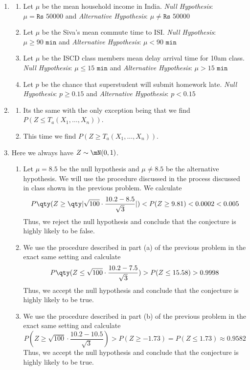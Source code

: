 \documentclass[12pt,english]{article}\usepackage[]{graphicx}\usepackage[]{xcolor}
\begin{document}
\begin{enumerate}[label=\arabic*.]
	\item
	\begin{enumerate}[label=(\alph*)]
		\item Let $\mu$ be the mean household income in India. \textit{Null Hypothesis}: $\mu=\texttt{Rs }50000$ and \textit{Alternative Hypothesis}: $\mu\neq\texttt{Rs }50000$
		\item Let $\mu$ be the Siva's mean commute time to ISI. \textit{Null Hypothesis}: $\mu\geq 90\texttt{ min}$ and \textit{Alternative Hypothesis}: $\mu<90\texttt{ min}$
		\item Let $\mu$ be the ISCD class members mean delay arrival time for 10am class. \textit{Null Hypothesis}: $\mu\leq 15 \texttt{ min}$ and \textit{Alternative Hypothesis}: $\mu>15 \texttt{ min}$
		\item Let $p$ be the chance that superstudent will submit homework late. \textit{Null Hypothesis}: $p\geq 0.15$ and \textit{Alternative Hypothesis}: $p<0.15$
	\end{enumerate}
	\item
	\begin{enumerate}[label=(\alph*)]
		\item Its the same with the only exception being that we find $P(Z\leq T_a(X_1,\ldots,X_n)).$
		\item This time we find $P(Z\geq T_a(X_1,\ldots,X_n)).$
	\end{enumerate}
	\item Here we always have $Z\sim\mN(0,1)$.
	\begin{enumerate}[label=(\alph*)]
		\item Let $\mu=8.5$ be the null hypothesis and $\mu\neq 8.5$ be the alternative hypothesis. We will use the procedure discussed in the process discussed in class shown in the previous problem. We calculate
		\[
			P\qty(Z\geq\qty|\sqrt{100}\cdot\frac{10.2-8.5}{\sqrt{3}}|)<P(Z\geq 9.81)<0.0002<0.005
		\]
		Thus, we reject the null hypothesis and conclude that the conjecture is highly likely to be false.
		\item We use the procedure described in part (a) of the previous problem in the exact same setting and calculate
		\[
			P\qty(Z\leq\sqrt{100}\cdot\frac{10.2-7.5}{\sqrt{3}})>P(Z\leq 15.58)>0.9998
		\]
		Thus, we accept the null hypothesis and conclude that the conjecture is highly likely to be true.
		\item We use the procedure described in part (b) of the previous problem in the exact same setting and calculate
		\[
			P(Z\geq\sqrt{100}\cdot\frac{10.2-10.5}{\sqrt{3}})>P(Z\geq-1.73)=P(Z\leq 1.73)\approx 0.9582
		\]
		Thus, we accept the null hypothesis and conclude that the conjecture is highly likely to be true.
	\end{enumerate}
	

\end{enumerate}
\end{document}
